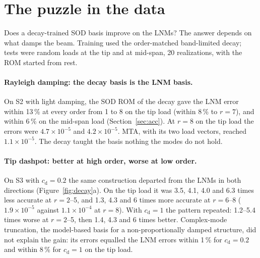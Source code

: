 \documentclass[preprint,12pt]{elsarticle}
\begin{document}
\begin{table}[t]
\centering\small
\caption{Simulation settings. Random seeds, scripts and run times are listed in the reproduction manual (\ref{app:repro}).}
\label{tab:repro}
\end{table}
\section{The puzzle in the data}\label{sec:puzzle}
Does a decay-trained SOD basis improve on the LNMs? The answer depends on what damps the beam. Training used the order-matched band-limited decay; tests were random loads at the tip and at mid-span, 20 realizations, with the ROM started from rest.

\paragraph{Rayleigh damping: the decay basis is the LNM basis.} On S2 with light damping, the SOD ROM of the decay gave the LNM error within 13\,\% at every order from 1 to 8 on the tip load (within 8\,\% to $r=7$), and within 6\,\% on the mid-span load (Section~\ref{sec:acc}). At $r=8$ on the tip load the errors were $4.7\times10^{-5}$ and $4.2\times10^{-5}$. MTA, with its two load vectors, reached $1.1\times10^{-5}$. The decay taught the basis nothing the modes do not hold.

\paragraph{Tip dashpot: better at high order, worse at low order.} On S3 with $c_{\mathrm d}=0.2$ the same construction departed from the LNMs in both directions (Figure~\ref{fig:decay}a). On the tip load it was 3.5, 4.1, 4.0 and 6.3 times less accurate at $r=2$--5, and 1.3, 4.3 and 6 times more accurate at $r=6$--8 ($1.9\times10^{-5}$ against $1.1\times10^{-4}$ at $r=8$). With $c_{\mathrm d}=1$ the pattern repeated: 1.2--5.4 times worse at $r=2$--5, then 1.4, 4.3 and 6 times better. Complex-mode truncation, the model-based basis for a non-proportionally damped structure, did not explain the gain: its errors equalled the LNM errors within 1\,\% for $c_{\mathrm d}=0.2$ and within 8\,\% for $c_{\mathrm d}=1$ on the tip load.
\end{document}
